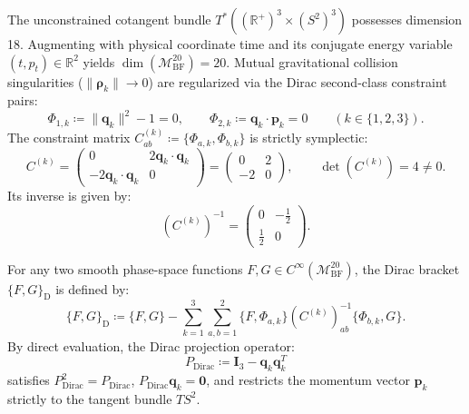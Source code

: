 \documentclass[11pt,a4paper,reqno]{article}
\theoremstyle{plain}
\theoremstyle{definition}
\theoremstyle{remark}
\numberwithin{equation}{section}
\numberwithin{table}{section}
\newcommand{\MbfTwenty}{\mathcal{M}_{\mathrm{BF}}^{20}}
\begin{document}
The unconstrained cotangent bundle $T^*((\mathbb{R}^+)^3 \times (S^2)^3)$ possesses dimension 18. Augmenting with physical coordinate time and its conjugate energy variable $(t, p_t) \in \mathbb{R}^2$ yields $\dim(\MbfTwenty) = 20$. Mutual gravitational collision singularities ($\|\bm{\rho}_k\| \to 0$) are regularized via the Dirac second-class constraint pairs:
\begin{equation}
  \Phi_{1,k} \coloneqq \|\bm{q}_k\|^2 - 1 = 0, \qquad \Phi_{2,k} \coloneqq \bm{q}_k \cdot \bm{p}_k = 0 \qquad (k \in \{1, 2, 3\}).
  \label{eq:dirac_constraints_bf20}
\end{equation}
The constraint matrix $C_{ab}^{(k)} \coloneqq \{\Phi_{a,k}, \Phi_{b,k}\}$ is strictly symplectic:
\begin{equation}
  C^{(k)} = \begin{pmatrix} 0 & 2\bm{q}_k \cdot \bm{q}_k \\ -2\bm{q}_k \cdot \bm{q}_k & 0 \end{pmatrix} = \begin{pmatrix} 0 & 2 \\ -2 & 0 \end{pmatrix}, \qquad \det(C^{(k)}) = 4 \ne 0.
\end{equation}
Its inverse is given by:
\begin{equation}
  (C^{(k)})^{-1} = \begin{pmatrix} 0 & -\frac{1}{2} \\ \frac{1}{2} & 0 \end{pmatrix}.
\end{equation}

For any two smooth phase-space functions $F, G \in C^\infty(\MbfTwenty)$, the Dirac bracket $\{F, G\}_{\mathrm{D}}$ is defined by:
\begin{equation}
  \{F, G\}_{\mathrm{D}} \coloneqq \{F, G\} - \sum_{k=1}^3 \sum_{a,b=1}^2 \{F, \Phi_{a,k}\} (C^{(k)})_{ab}^{-1} \{\Phi_{b,k}, G\}.
  \label{eq:dirac_bracket_definition}
\end{equation}
By direct evaluation, the Dirac projection operator:
\begin{equation}
  P_{\mathrm{Dirac}} \coloneqq \bm{I}_3 - \bm{q}_k \bm{q}_k^T
  \label{eq:dirac_projector}
\end{equation}
satisfies $P_{\mathrm{Dirac}}^2 = P_{\mathrm{Dirac}}$, $P_{\mathrm{Dirac}} \bm{q}_k = \bm{0}$, and restricts the momentum vector $\bm{p}_k$ strictly to the tangent bundle $T S^2$.
\end{document}
